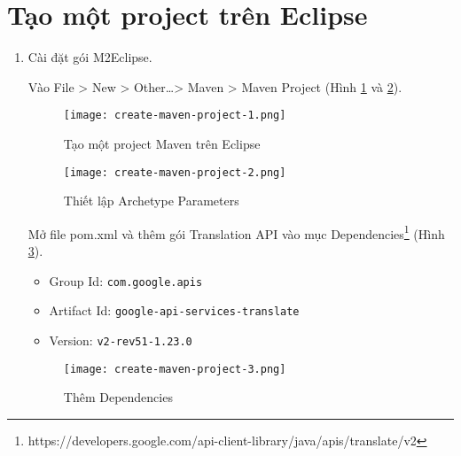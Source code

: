 \documentclass[../thesis.tex]{subfiles}
\begin{document}
\section{Tạo một project trên Eclipse}
\begin{enumerate}
	\item Cài đặt gói M2Eclipse.
	\begin{item}
	Vào File > New > Other\ldots > Maven > Maven Project (Hình \ref{Tao mot project Maven tren Eclipse} và \ref{Thiet lap Archetype Parameters}).
	\begin{figure}[h]
		\texttt{[image: create-maven-project-1.png]}
		\caption{Tạo một project Maven trên Eclipse}
		\label{Tao mot project Maven tren Eclipse}
	\end{figure}
	\begin{figure}[h]
		\texttt{[image: create-maven-project-2.png]}
		\caption{Thiết lập Archetype Parameters}
		\label{Thiet lap Archetype Parameters}
	\end{figure}
	\end{item}	
	\begin{item}
	Mở file pom.xml và thêm gói Translation API vào mục Dependencies\footnote{https://developers.google.com/api-client-library/java/apis/translate/v2} (Hình \ref{Them Dependencies}).
	\begin{itemize}
		\item Group Id: \lstinline{com.google.apis}
		\item Artifact Id: \lstinline{google-api-services-translate}
		\item Version: \lstinline{v2-rev51-1.23.0}
	\end{itemize}
	\begin{figure}
		\texttt{[image: create-maven-project-3.png]}
		\caption{Thêm Dependencies}
		\label{Them Dependencies}
	\end{figure}
	\end{item}
\end{enumerate}
\end{document}
